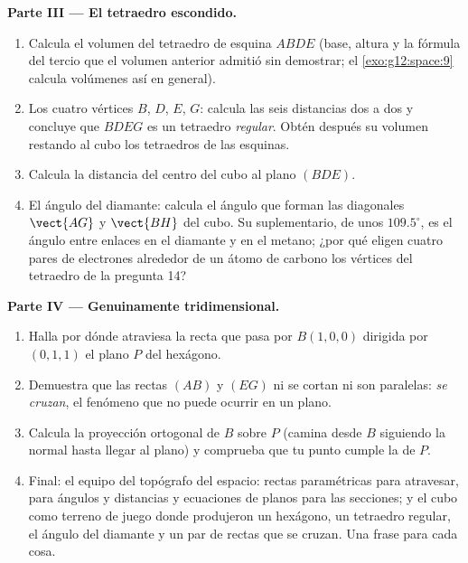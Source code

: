 \begin{problem}
\medskip
\noindent\textbf{Parte III --- El tetraedro escondido.}
\begin{enumerate}[resume]
  \item Calcula el volumen del tetraedro de esquina $ABDE$ (base, altura y
        la fórmula del tercio que el volumen anterior admitió sin
        demostrar; el \cref{exo:g12:space:9} calcula volúmenes así en
        general).
  \item Los cuatro vértices $B$, $D$, $E$, $G$: calcula las seis distancias
        dos a dos y concluye que $BDEG$ es un tetraedro \emph{regular}.
        Obtén después su volumen restando al cubo los tetraedros de las
        esquinas.
  \item Calcula la distancia del centro del cubo al plano $(BDE)$.
  \item El ángulo del diamante: calcula el ángulo que forman las diagonales
        $\vect{AG}$ y $\vect{BH}$ del cubo. Su suplementario, de unos
        $109.5^\circ$, es el ángulo entre enlaces en el diamante y en el
        metano; ¿por qué eligen cuatro pares de electrones alrededor de un
        átomo de carbono los vértices del tetraedro de la pregunta 14?
\end{enumerate}

\medskip
\noindent\textbf{Parte IV --- Genuinamente tridimensional.}
\begin{enumerate}[resume]
  \item Halla por dónde atraviesa la recta que pasa por $B(1,0,0)$ dirigida
        por $(0,1,1)$ el plano $P$ del hexágono.
  \item Demuestra que las rectas $(AB)$ y $(EG)$ ni se cortan ni son
        paralelas: \emph{se cruzan}, el fenómeno que no puede ocurrir en un
        plano.
  \item Calcula la proyección ortogonal de $B$ sobre $P$ (camina desde $B$
        siguiendo la normal hasta llegar al plano) y comprueba que tu punto
        cumple la  de $P$.
  \item Final: el equipo del topógrafo del espacio: rectas paramétricas
        para atravesar,  para ángulos y distancias y
        ecuaciones de planos para las secciones; y el cubo como terreno de
        juego donde produjeron un hexágono, un tetraedro regular, el ángulo
        del diamante y un par de rectas que se cruzan. Una frase para cada
        cosa.
\end{enumerate}
\end{problem}
